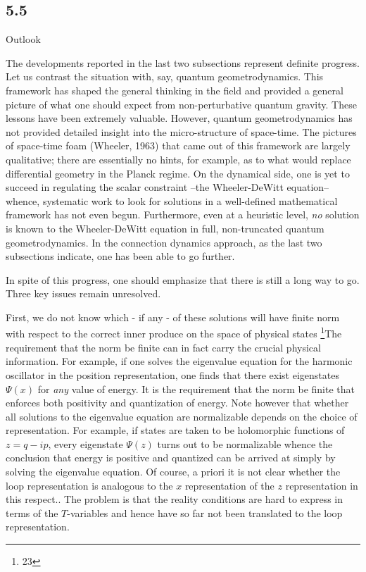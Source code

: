 \goodbreak
\subsection{5.5}{Outlook}

The developments reported in the last two subsections represent definite
progress. Let us contrast the situation with, say, quantum geometrodynamics.
This framework has shaped the general thinking in the field and provided a
general picture of what one should expect from non-perturbative quantum
gravity. These lessons have been extremely valuable. However, quantum
geometrodynamics has not provided detailed insight into the micro-structure
of space-time. The pictures of space-time foam (Wheeler, 1963) that came out
of this framework are largely qualitative; there are essentially no hints,
for example, as to what would replace differential geometry in the Planck
regime. On the dynamical side, one is yet to succeed in regulating the
scalar constraint --the Wheeler-DeWitt equation-- whence, systematic work to
look for solutions in a well-defined mathematical framework has not even begun.
Furthermore, even at a heuristic level, {\it no} solution is known to the
Wheeler-DeWitt equation in full, non-truncated quantum geometrodynamics. In
the connection dynamics approach, as the last two subsections indicate, one
has been able to go further.

In spite of this progress, one should emphasize that there is still a long
way to go. Three key issues remain unresolved.

First, we do not know which - if any - of these solutions will have finite
norm with respect to the correct inner produce on the space of physical states
\footnote{23}{The requirement that the norm be finite can in fact carry the
crucial physical information. For example, if one solves the eigenvalue
equation for the harmonic oscillator in the position representation, one finds
that there exist eigenstates $\Psi(x)$ for {\it any} value of energy. It is
the requirement that the norm be finite that enforces both positivity and
quantization of energy. Note however that whether all solutions to the
eigenvalue equation are normalizable depends on the choice of representation.
For example, if states are taken to be holomorphic functions of $z=q-ip$,
every eigenstate $\Psi(z)$ turns out to be normalizable whence the conclusion
that energy is positive and quantized can be arrived at simply by solving the
eigenvalue equation. Of course, a priori it is not clear whether the loop
representation is analogous to the $x$ representation of the $z$ representation
in this respect.}.
The problem is that the reality conditions are hard to express in terms of
the $T$-variables and hence have so far not been translated to the loop
representation.

